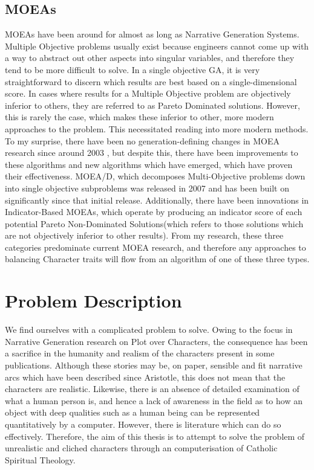 \documentclass[11pt]{article}
\begin{document}
\subsection{MOEAs}
MOEAs have been around for almost as long as Narrative Generation Systems. Multiple Objective problems usually exist because engineers cannot come up with a way to abstract out other aspects into singular variables, and therefore they tend to be more difficult to solve. In a single objective GA, it is very straightforward to discern which results are best based on a single-dimensional score. In cases where results for a Multiple Objective problem are objectively inferior to others, they are referred to as Pareto Dominated solutions. However, this is rarely the case, which makes these inferior to other, more modern approaches to the problem\cite{AchievementScalarazingIndicatorBased}. This necessitated reading into more modern methods. To my surprise, there have been no generation-defining changes in MOEA research since around 2003 \cite{MOEASurvey1}, but despite this, there have been improvements to these algorithms and new algorithms which have emerged, which have proven their effectiveness. MOEA/D, which decomposes Multi-Objective problems down into single objective subproblems \cite{MOEAD} was released in 2007 and has been built on significantly since that initial release. Additionally, there have been innovations in Indicator-Based MOEAs, which operate by producing an indicator score of each potential Pareto Non-Dominated Solutions(which refers to those solutions which are not objectively inferior to other results). From my research, these three categories predominate current MOEA research, and therefore any approaches to balancing Character traits will flow from an algorithm of one of these three types.

\section{Problem Description}
We find ourselves with a complicated problem to solve. Owing to the focus in Narrative Generation research on Plot over Characters, the consequence has been a sacrifice in the humanity and realism of the characters present in some publications. Although these stories may be, on paper, sensible and fit narrative arcs which have been described since Aristotle, this does not mean that the characters are realistic. Likewise, there is an absence of detailed examination of what a human person is, and hence a lack of awareness in the field as to how an object with deep qualities such as a human being can be represented quantitatively by a computer. However, there is literature which can do so effectively. Therefore, the aim of this thesis is to attempt to solve the problem of unrealistic and cliched characters through an computerisation of Catholic Spiritual Theology.
\end{document}
